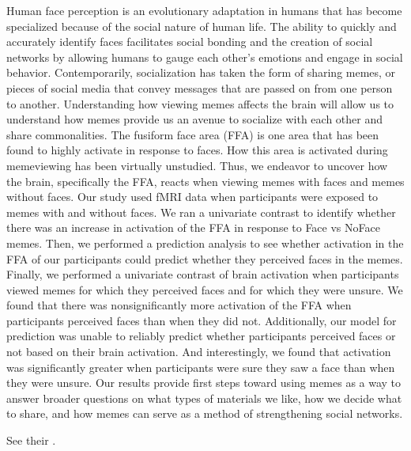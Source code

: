 \documentclass[letterpaper,10pt,english]{sphinxmanual}
\begin{document}
Human face perception is an evolutionary adaptation in humans that has become specialized because of the social nature of human life. The ability to quickly and accurately identify faces facilitates social bonding and the creation of social networks by allowing humans to gauge each other’s emotions and engage in social behavior. Contemporarily, socialization has taken the form of sharing memes, or pieces of social media that convey messages that are passed on from one person to another. Understanding how viewing memes affects the brain will allow us to understand how memes provide us an avenue to socialize with each other and share commonalities. The fusiform face area (FFA) is one area that has been found to highly activate in response to faces. How this area is activated during meme\sphinxhyphen{}viewing has been virtually unstudied. Thus, we endeavor to uncover how the brain, specifically the FFA, reacts when viewing memes with faces and memes without faces. Our study used fMRI data when participants were exposed to memes with and without faces. We ran a univariate contrast to identify whether there was an increase in activation of the FFA in response to Face vs NoFace memes. Then, we performed a prediction analysis to see whether activation in the FFA of our participants could predict whether they perceived faces in the memes. Finally, we performed a univariate contrast of brain activation when participants viewed memes for which they perceived faces and for which they were unsure. We found that there was non\sphinxhyphen{}significantly more activation of the FFA when participants perceived faces than when they did not. Additionally, our model for prediction was unable to reliably predict whether participants perceived faces or not based on their brain activation. And interestingly, we found that activation was significantly greater when participants were sure they saw a face than when they were unsure. Our results provide first steps toward using memes as a way to answer broader questions on what types of materials we like, how we decide what to share, and how memes can serve as a method of strengthening social networks.

See their .
\end{document}
